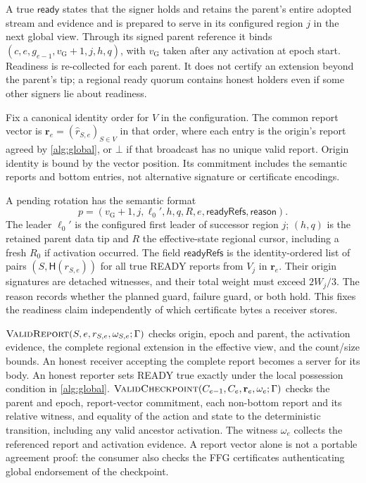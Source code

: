 \documentclass[11pt,a4paper,onecolumn]{article}
\newcommand{\Hash}{\mathsf H}
\newcommand{\gv}{v_{\mathrm G}}
\newcommand{\botv}{\bot}
\newcommand{\Proc}[1]{\textnormal{\textsc{#1}}}
\theoremstyle{remark}\newtheorem{example}[definition]{Example}
\begin{document}
A true $\mathsf{ready}$ states that the signer holds and retains the parent's
entire adopted stream and evidence and is prepared to serve in its configured
region $j$ in the next global view. Through its signed parent reference it
binds $(c,e,g_{e-1},\gv+1,j,h,q)$, with $\gv$ taken after any activation at
epoch start. Readiness is re-collected for each parent. It does not certify
an extension beyond the parent's tip; a regional ready quorum contains honest
holders even if some other signers lie about readiness.

Fix a canonical identity order for $V$ in the configuration. The common report
vector is $\mathbf r_e=(\widehat r_{S,e})_{S\in V}$ in that order, where each
entry is the origin's report agreed by \cref{alg:global}, or $\botv$ if that
broadcast has no unique valid report. Origin identity is bound by the vector
position. Its commitment includes the semantic reports and bottom entries,
not alternative signature or certificate encodings.

A pending rotation has the semantic format
\[
 p=(\gv+1,j,\ell_0',h,q,R,e,\mathsf{readyRefs},\mathsf{reason}).
\]
The leader $\ell_0'$ is the configured first leader of successor region $j$;
$(h,q)$ is the retained parent data tip and $R$ the effective-state regional
cursor, including a fresh $R_0$ if activation occurred. The field $\mathsf{readyRefs}$
is the identity-ordered list of pairs $(S,\Hash(r_{S,e}))$ for all true READY
reports from $V_j$ in $\mathbf r_e$. Their origin signatures are detached
witnesses, and their total weight must exceed $2W_j/3$.
The reason records whether the planned guard, failure guard, or both hold.
This fixes the readiness claim independently of which certificate bytes a
receiver stores.

$\Proc{ValidReport}(S,e,r_{S,e},\omega_{S,e};\Gamma)$ checks origin, epoch and
parent, the activation evidence, the complete regional extension in the
effective view, and the count/size bounds. An honest receiver accepting the
complete report becomes a server for its body. An honest reporter sets READY
true exactly under the local possession condition in \cref{alg:global}.
$\Proc{ValidCheckpoint}(C_{e-1},C_e,\mathbf r_e,\omega_e;\Gamma)$ checks the
parent and epoch, report-vector commitment, each non-bottom report and its
relative witness, and equality of the action and state to the deterministic
transition, including any valid ancestor activation. The witness $\omega_e$
collects the referenced report and activation evidence. A report vector alone
is not a portable agreement proof: the consumer also checks the FFG
certificates authenticating global endorsement of the checkpoint.
\end{document}
